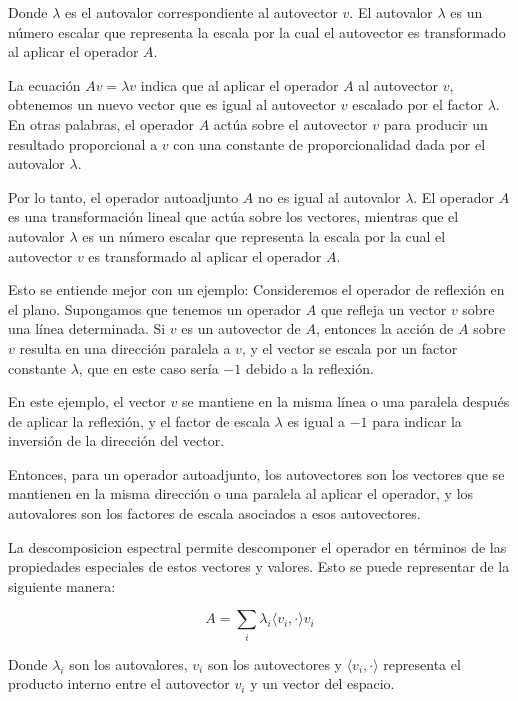 \documentclass{article}
\begin{document}
    Donde $\lambda$ es el autovalor correspondiente al autovector $v$. El autovalor $\lambda$ es un número escalar que representa la escala por la cual el autovector es transformado al aplicar el operador $A$.

    La ecuación $Av = \lambda v$ indica que al aplicar el operador $A$ al autovector $v$, obtenemos un nuevo vector que es igual al autovector $v$ escalado por el factor $\lambda$. En otras palabras, el operador $A$ actúa sobre el autovector $v$ para producir un resultado proporcional a $v$ con una constante de proporcionalidad dada por el autovalor $\lambda$.

    Por lo tanto, el operador autoadjunto $A$ no es igual al autovalor $\lambda$. El operador $A$ es una transformación lineal que actúa sobre los vectores, mientras que el autovalor $\lambda$ es un número escalar que representa la escala por la cual el autovector $v$ es transformado al aplicar el operador $A$.

   Esto se entiende mejor con un ejemplo: Consideremos el operador de reflexión en el plano. Supongamos que tenemos un operador $A$ que refleja un vector $v$ sobre una línea determinada. Si $v$ es un autovector de $A$, entonces la acción de $A$ sobre $v$ resulta en una dirección paralela a $v$, y el vector se escala por un factor constante $\lambda$, que en este caso sería $-1$ debido a la reflexión. 

    En este ejemplo, el vector $v$ se mantiene en la misma línea o una paralela después de aplicar la reflexión, y el factor de escala $\lambda$ es igual a $-1$ para indicar la inversión de la dirección del vector.
    
    Entonces, para un operador autoadjunto, los autovectores son los vectores que se mantienen en la misma dirección o una paralela al aplicar el operador, y los autovalores son los factores de escala asociados a esos autovectores.
    
    La descomposicion espectral permite descomponer el operador en términos de las propiedades especiales de estos vectores y valores. Esto se puede representar de la siguiente manera:
    
    \begin{equation}
    A = \sum_{i} \lambda_i \langle v_i, \cdot \rangle v_i
    \end{equation}
    
    Donde $\lambda_i$ son los autovalores, $v_i$ son los autovectores y $\langle v_i, \cdot \rangle$ representa el producto interno entre el autovector $v_i$ y un vector del espacio.
    
\end{document}
